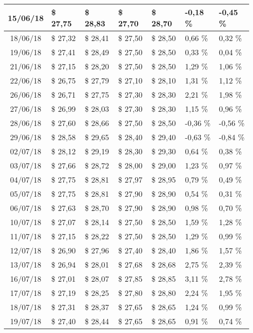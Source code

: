 \begin{center}
\begin{longtable}{|c|p{1.5cm}|p{1.5cm}|p{1.5cm}|p{1.5cm}|p{1.5cm}|p{1.5cm}|}
15/06/18 & \$ 27,75 & \$ 28,83 & \$ 27,70 & \$ 28,70 & -0,18 \% & -0,45 \% \\ \hline
18/06/18 & \$ 27,32 & \$ 28,41 & \$ 27,50 & \$ 28,50 & 0,66 \% & 0,32 \% \\ \hline
19/06/18 & \$ 27,41 & \$ 28,49 & \$ 27,50 & \$ 28,50 & 0,33 \% & 0,04 \% \\ \hline
21/06/18 & \$ 27,15 & \$ 28,20 & \$ 27,50 & \$ 28,50 & 1,29 \% & 1,06 \% \\ \hline
22/06/18 & \$ 26,75 & \$ 27,79 & \$ 27,10 & \$ 28,10 & 1,31 \% & 1,12 \% \\ \hline
26/06/18 & \$ 26,71 & \$ 27,75 & \$ 27,30 & \$ 28,30 & 2,21 \% & 1,98 \% \\ \hline
27/06/18 & \$ 26,99 & \$ 28,03 & \$ 27,30 & \$ 28,30 & 1,15 \% & 0,96 \% \\ \hline
28/06/18 & \$ 27,60 & \$ 28,66 & \$ 27,50 & \$ 28,50 & -0,36 \% & -0,56 \% \\ \hline
29/06/18 & \$ 28,58 & \$ 29,65 & \$ 28,40 & \$ 29,40 & -0,63 \% & -0,84 \% \\ \hline
02/07/18 & \$ 28,12 & \$ 29,19 & \$ 28,30 & \$ 29,30 & 0,64 \% & 0,38 \% \\ \hline
03/07/18 & \$ 27,66 & \$ 28,72 & \$ 28,00 & \$ 29,00 & 1,23 \% & 0,97 \% \\ \hline
04/07/18 & \$ 27,75 & \$ 28,81 & \$ 27,97 & \$ 28,95 & 0,79 \% & 0,49 \% \\ \hline
05/07/18 & \$ 27,75 & \$ 28,81 & \$ 27,90 & \$ 28,90 & 0,54 \% & 0,31 \% \\ \hline
06/07/18 & \$ 27,63 & \$ 28,70 & \$ 27,90 & \$ 28,90 & 0,98 \% & 0,70 \% \\ \hline
10/07/18 & \$ 27,07 & \$ 28,14 & \$ 27,50 & \$ 28,50 & 1,59 \% & 1,28 \% \\ \hline
11/07/18 & \$ 27,15 & \$ 28,22 & \$ 27,50 & \$ 28,50 & 1,29 \% & 0,99 \% \\ \hline
12/07/18 & \$ 26,90 & \$ 27,96 & \$ 27,40 & \$ 28,40 & 1,86 \% & 1,57 \% \\ \hline
13/07/18 & \$ 26,94 & \$ 28,01 & \$ 27,68 & \$ 28,68 & 2,75 \% & 2,39 \% \\ \hline
16/07/18 & \$ 27,01 & \$ 28,07 & \$ 27,85 & \$ 28,85 & 3,11 \% & 2,78 \% \\ \hline
17/07/18 & \$ 27,19 & \$ 28,25 & \$ 27,80 & \$ 28,80 & 2,24 \% & 1,95 \% \\ \hline
18/07/18 & \$ 27,31 & \$ 28,37 & \$ 27,65 & \$ 28,65 & 1,24 \% & 0,99 \% \\ \hline
19/07/18 & \$ 27,40 & \$ 28,44 & \$ 27,65 & \$ 28,65 & 0,91 \% & 0,74 \% \\ \hline

\end{longtable}
\end{center}
